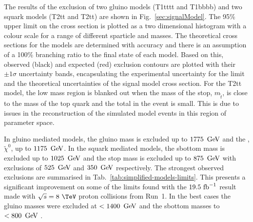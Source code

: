 The results of the exclusion of two gluino models (T1tttt and T1bbbb)
and two squark models (T2tt and T2tt) are shown in
Fig.~\ref{sec:signalModel}. The 95\% \CL upper limit on the cross
section is plotted as a two dimensional histogram with a colour scale
for a range of different sparticle and \LSP masses. The theoretical
cross sections for the models are determined with \NLO
accuracy and there is an assumption of a 100\% branching ratio to the
final state of each model. Based on this, observed (black) and
expected (red) exclusion contours are plotted with their $\pm1\sigma$
uncertainty bands, encapsulating the experimental uncertainty for the
limit and the theoretical uncertainties of the signal model cross
section. For the T2tt model, the low mass region is blanked out when
the mass of the stop, $m_{\tilde{t}}$, is close to the mass of the top
quark and the total \MET in the event is small. This is due to issues
in the \MET reconstruction of the simulated \SUSY model events in this
region of parameter space.

In gluino mediated models, the gluino mass is excluded up to 
$1775~\mathrm{\,Ge\kern -0.1em V}$ and the \LSP, $\tilde{\chi}^0$, up to $1175~\mathrm{\,Ge\kern -0.1em V}$. In the
squark mediated models, the sbottom mass is excluded up to $1025~\mathrm{\,Ge\kern -0.1em V}$
and the stop mass is excluded up to $875~\mathrm{\,Ge\kern -0.1em V}$ with \LSP exclusions of
$525~\mathrm{\,Ge\kern -0.1em V}$ and $350~\mathrm{\,Ge\kern -0.1em V}$ respectively. The strongest observed
exclusions are summarised in Tab.~\ref{tab:simplified-models-limits}.
This presents a significant improvement on some of the limits found
with the $19.5~\text{fb}^{-1}$ result made with $\sqrt{s}=8~\tev$ proton
collisions from Run~1. In the best cases the gluino masses were
excluded at $<1400~\mathrm{\,Ge\kern -0.1em V}$ and the sbottom masses to $<800~\mathrm{\,Ge\kern -0.1em V}$
\cite{smsTwiki}.

